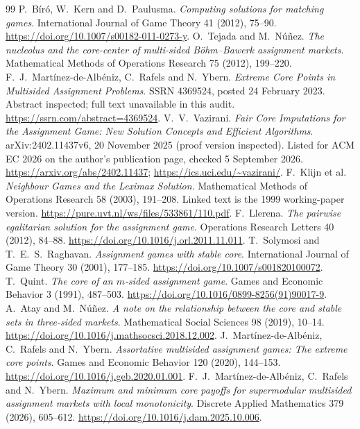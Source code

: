 \documentclass[11pt]{article}
\begin{document}
\begin{thebibliography}{99}
\small
{} P.~B\'ir\'o, W.~Kern and D.~Paulusma.
\emph{Computing solutions for matching games}.
International Journal of Game Theory 41 (2012), 75--90.
\url{https://doi.org/10.1007/s00182-011-0273-y}.
 O.~Tejada and M.~N\'u\~nez.
\emph{The nucleolus and the core-center of multi-sided B\"ohm--Bawerk
assignment markets}. Mathematical Methods of Operations Research 75
(2012), 199--220.
 F.~J.~Mart\'inez-de-Alb\'eniz, C.~Rafels and N.~Ybern.
\emph{Extreme Core Points in Multisided Assignment Problems}.
SSRN 4369524, posted 24 February 2023. Abstract inspected; full text
unavailable in this audit. \url{https://ssrn.com/abstract=4369524}.
 V.~V.~Vazirani. \emph{Fair Core Imputations for the Assignment
Game: New Solution Concepts and Efficient Algorithms}. arXiv:2402.11437v6,
20 November 2025 (proof version inspected). Listed for ACM EC 2026 on the
author's publication page, checked 5 September 2026.
\url{https://arxiv.org/abs/2402.11437};
\url{https://ics.uci.edu/~vazirani/}.
 F.~Klijn et al. \emph{Neighbour Games and the Leximax Solution}.
Mathematical Methods of Operations Research 58 (2003), 191--208.
Linked text is the 1999 working-paper version.
\url{https://pure.uvt.nl/ws/files/533861/110.pdf}.
 F.~Llerena. \emph{The pairwise egalitarian solution for the
assignment game}. Operations Research Letters 40 (2012), 84--88.
\url{https://doi.org/10.1016/j.orl.2011.11.011}.
 T.~Solymosi and T.~E.~S.~Raghavan.
\emph{Assignment games with stable core}. International Journal of Game
Theory 30 (2001), 177--185. \url{https://doi.org/10.1007/s001820100072}.
 T.~Quint. \emph{The core of an $m$-sided assignment game}.
Games and Economic Behavior 3 (1991), 487--503.
\url{https://doi.org/10.1016/0899-8256(91)90017-9}.
 A.~Atay and M.~N\'u\~nez. \emph{A note on the relationship
between the core and stable sets in three-sided markets}.
Mathematical Social Sciences 98 (2019), 10--14.
\url{https://doi.org/10.1016/j.mathsocsci.2018.12.002}.
 J.~Mart\'inez-de-Alb\'eniz, C.~Rafels and N.~Ybern.
\emph{Assortative multisided assignment games: The extreme core points}.
Games and Economic Behavior 120 (2020), 144--153.
\url{https://doi.org/10.1016/j.geb.2020.01.001}.
 F.~J.~Mart\'inez-de-Alb\'eniz, C.~Rafels and N.~Ybern.
\emph{Maximum and minimum core payoffs for supermodular multisided assignment
markets with local monotonicity}. Discrete Applied Mathematics 379 (2026),
605--612. \url{https://doi.org/10.1016/j.dam.2025.10.006}.
\end{thebibliography}
\end{document}
